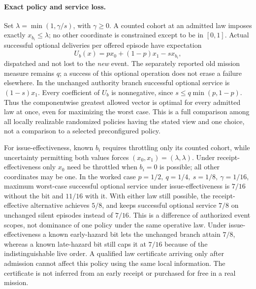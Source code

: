 \documentclass{article}
\begin{document}
\paragraph{Exact policy and service loss.}
Set \(\lambda=\min(1,\gamma/s)\), with \(\gamma\ge0\).
A counted cohort at an admitted law imposes exactly \(x_{b_i}\le
\lambda\); no other coordinate is constrained except to be in
\([0,1]\). Actual successful optional deliveries per offered
episode have expectation
\[
 U_b(x)=p x_0+(1-p)x_1-sx_{b_i},
\]
dispatched and not lost to the \emph{new} event. The separately
reported old mission measure remains \(q\); a success of this
optional operation does not erase a failure elsewhere. In the
unchanged authority branch successful optional service is
\((1-s)x_1\). Every coefficient of \(U_b\) is nonnegative, since
\(s\le q\min(p,1-p)\). Thus the componentwise greatest allowed
vector is optimal for every admitted law at once, even for
maximizing the worst case. This is a full comparison among
all locally realizable randomized policies having the stated view
and one choice, not a comparison to a selected preconfigured policy.

For issue-effectiveness, known \(b_i\) requires throttling only
its counted cohort, while uncertainty permitting both values
forces \((x_0,x_1)=(\lambda,\lambda)\). Under receipt-effectiveness
only \(x_0\) need be throttled when \(b_i=0\) is possible; all
other coordinates may be one. In the worked case
\(p=1/2,\ q=1/4,\ s=1/8,\ \gamma=1/16\), maximum worst-case
successful optional service under issue-effectiveness is
\(7/16\) without the bit and \(11/16\) with it.
With either law still possible, the receipt-effective alternative
achieves \(5/8\), and keeps successful optional service \(7/8\)
on unchanged silent episodes instead of \(7/16\).
This is a difference of authorized event scopes, not dominance
of one policy under the same operative law. Under issue-effectiveness
a known early-hazard bit lets the unchanged branch attain \(7/8\),
whereas a known late-hazard bit still caps it at \(7/16\) because
of the indistinguishable live order. A qualified law certificate
arriving only after admission cannot affect this policy using the
same local information. The certificate is not inferred from an
early receipt or purchased for free in a real mission.
\end{document}
